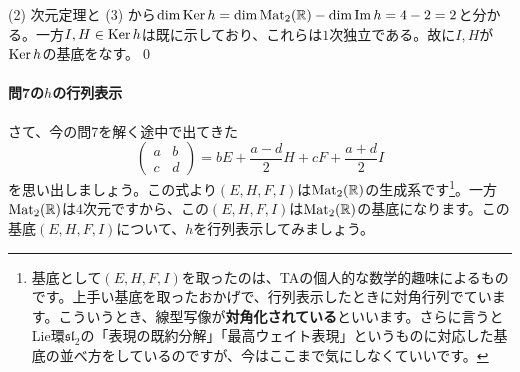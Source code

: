\noindent (2) 次元定理と (3) から$\dim \operatorname{Ker} h = \dim \operatorname{Mat}_2(\mathbb{R}) - \dim \mathrm{Im}\, h = 4 - 2 = 2$と分かる。一方$I, H \in \operatorname{Ker} h$は既に示しており、これらは$1$次独立である。故に$I, H$が$\operatorname{Ker} h$の基底をなす。\qed

\paragraph{問7の$h$の行列表示}

さて、今の問7を解く途中で出てきた
\[
\begin{pmatrix}
a & b \\
c & d
\end{pmatrix}
= 
bE + \frac{a - d}{2} H + cF + \frac{a + d}{2} I
\]
を思い出しましょう。この式より$(E, H, F, I)$は$\operatorname{Mat}_2(\mathbb{R})$の生成系です\footnote{基底として$(E, H, F, I)$を取ったのは、TAの個人的な数学的趣味によるものです。上手い基底を取ったおかげで、行列表示したときに対角行列でています。こういうとき、線型写像が\textbf{対角化されている}といいます。さらに言うとLie環$\mathfrak{sl}_2$の「表現の既約分解」「最高ウェイト表現」というものに対応した基底の並べ方をしているのですが、今はここまで気にしなくていいです。}。一方$\operatorname{Mat}_2(\mathbb{R})$は$4$次元ですから、この$(E, H, F, I)$は$\operatorname{Mat}_2(\mathbb{R})$の基底になります。この基底$(E, H, F, I)$について、$h$を行列表示してみましょう。

